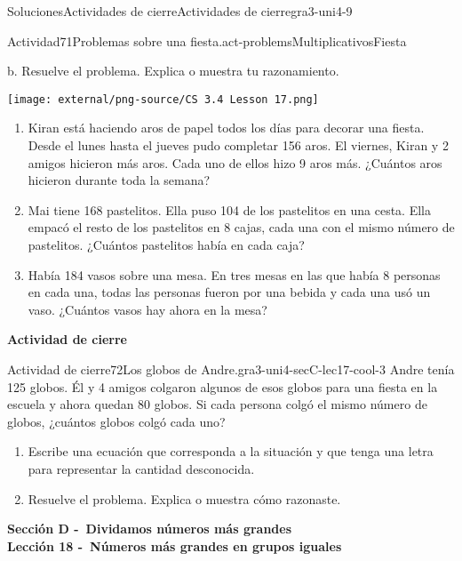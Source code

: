\documentclass[twoside,10pt,]{article}
\begin{document}
\begin{solutions-section}{Soluciones}{Actividades de cierre}{}{Actividades de cierre}{}{}{gra3-uni4-9}
\begin{activitysolution}{Actividad}{71}{Problemas sobre una fiesta.}{act-problemsMultiplicativosFiesta}
\begin{sidebyside}{2}{0}{0}{0}
\begin{sbspanel}{0.6}
b. Resuelve el problema. Explica o muestra tu razonamiento.%
\end{sbspanel}%
\begin{sbspanel}{0.4}%
\texttt{[image: external/png-source/CS 3.4 Lesson 17.png]}
\end{sbspanel}%
\end{sidebyside}%
%
\begin{enumerate}
\item{}Kiran está haciendo aros de papel todos los días para decorar una fiesta. Desde el lunes hasta el jueves pudo completar 156 aros. El viernes, Kiran y 2 amigos hicieron más aros. Cada uno de ellos hizo 9 aros más. ¿Cuántos aros hicieron durante toda la semana?%
\item{}Mai tiene 168 pastelitos. Ella puso 104 de los pastelitos en una cesta. Ella empacó el resto de los pastelitos en 8 cajas, cada una con el mismo número de pastelitos. ¿Cuántos pastelitos había en cada caja?%
\item{}Había 184 vasos sobre una mesa. En tres mesas en las que había 8 personas en cada una, todas las personas fueron por una bebida y cada una usó un vaso. ¿Cuántos vasos hay ahora en la mesa?%
\end{enumerate}
\end{activitysolution}%
\par\medskip
\noindent\textbf{\large{}\space\textperiodcentered\space{}Actividad de cierre}
\begin{projectsolution}{Actividad de cierre}{72}{Los globos de Andre.}{gra3-uni4-secC-lec17-cool-3}%
Andre tenía 125 globos. Él y 4 amigos colgaron algunos de esos globos para una fiesta en la escuela y ahora quedan 80 globos. Si cada persona colgó el mismo número de globos, ¿cuántos globos colgó cada uno?%
%
\begin{enumerate}
\item{}Escribe una ecuación que corresponda a la situación y que tenga una letra para representar la cantidad desconocida.%
\item{}Resuelve el problema. Explica o muestra cómo razonaste.%
\end{enumerate}
\end{projectsolution}%
\par\medskip
\noindent\textbf{\large{}\space\textperiodcentered\space{}Sección D -~Dividamos números más grandes\\
\space\textperiodcentered\space{}Lección 18 -~Números más grandes en grupos iguales\\
}
\end{solutions-section}
\end{document}
